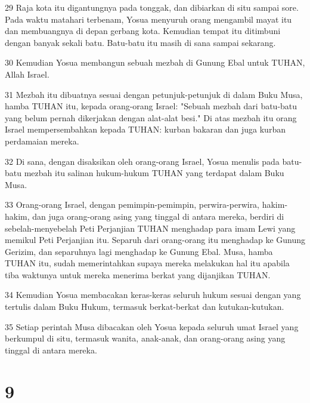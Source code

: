 \par 29 Raja kota itu digantungnya pada tonggak, dan dibiarkan di situ sampai sore. Pada waktu matahari terbenam, Yosua menyuruh orang mengambil mayat itu dan membuangnya di depan gerbang kota. Kemudian tempat itu ditimbuni dengan banyak sekali batu. Batu-batu itu masih di sana sampai sekarang.
\par 30 Kemudian Yosua membangun sebuah mezbah di Gunung Ebal untuk TUHAN, Allah Israel.
\par 31 Mezbah itu dibuatnya sesuai dengan petunjuk-petunjuk di dalam Buku Musa, hamba TUHAN itu, kepada orang-orang Israel: "Sebuah mezbah dari batu-batu yang belum pernah dikerjakan dengan alat-alat besi." Di atas mezbah itu orang Israel mempersembahkan kepada TUHAN: kurban bakaran dan juga kurban perdamaian mereka.
\par 32 Di sana, dengan disaksikan oleh orang-orang Israel, Yosua menulis pada batu-batu mezbah itu salinan hukum-hukum TUHAN yang terdapat dalam Buku Musa.
\par 33 Orang-orang Israel, dengan pemimpin-pemimpin, perwira-perwira, hakim-hakim, dan juga orang-orang asing yang tinggal di antara mereka, berdiri di sebelah-menyebelah Peti Perjanjian TUHAN menghadap para imam Lewi yang memikul Peti Perjanjian itu. Separuh dari orang-orang itu menghadap ke Gunung Gerizim, dan separuhnya lagi menghadap ke Gunung Ebal. Musa, hamba TUHAN itu, sudah memerintahkan supaya mereka melakukan hal itu apabila tiba waktunya untuk mereka menerima berkat yang dijanjikan TUHAN.
\par 34 Kemudian Yosua membacakan keras-keras seluruh hukum sesuai dengan yang tertulis dalam Buku Hukum, termasuk berkat-berkat dan kutukan-kutukan.
\par 35 Setiap perintah Musa dibacakan oleh Yosua kepada seluruh umat Israel yang berkumpul di situ, termasuk wanita, anak-anak, dan orang-orang asing yang tinggal di antara mereka.

\chapter{9}

